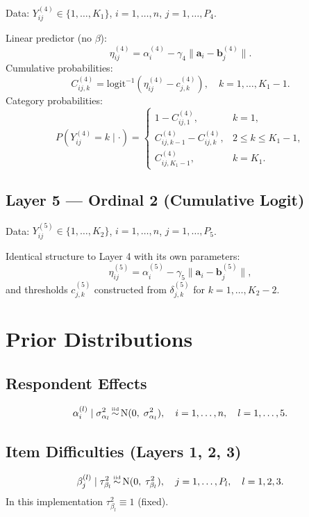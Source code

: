 \documentclass[A4paper,11pt]{article}
\newcommand{\msim}{\mathop{\rm \sim}}
\newcommand{\iid}{\msim\limits^{\mbox{\tiny iid}}}
\begin{document}
Data: $Y^{(4)}_{ij} \in \{1,\dots,K_1\}$, \; $i=1,\dots,n$, \; $j=1,\dots,P_4$.

Linear predictor (no $\beta$):
\[
  \eta^{(4)}_{ij} = \alpha^{(4)}_i - \gamma_4 \|\bm{a}_i - \bm{b}^{(4)}_j\|.
\]
Cumulative probabilities:
\[
  C^{(4)}_{ij,k} = \mathrm{logit}^{-1}\!\left(\eta^{(4)}_{ij} - c^{(4)}_{j,k}\right), \quad k=1,\dots,K_1-1.
\]
Category probabilities:
\[
  P\!\left(Y^{(4)}_{ij} = k \mid \cdot\right) =
  \begin{cases}
    1 - C^{(4)}_{ij,1}, & k = 1, \\
    C^{(4)}_{ij,k-1} - C^{(4)}_{ij,k}, & 2 \le k \le K_1-1, \\
    C^{(4)}_{ij,K_1-1}, & k = K_1.
  \end{cases}
\]

\subsection{Layer 5 --- Ordinal 2 (Cumulative Logit)}

Data: $Y^{(5)}_{ij} \in \{1,\dots,K_2\}$, \; $i=1,\dots,n$, \; $j=1,\dots,P_5$.

Identical structure to Layer 4 with its own parameters:
\[
  \eta^{(5)}_{ij} = \alpha^{(5)}_i - \gamma_5 \|\bm{a}_i - \bm{b}^{(5)}_j\|,
\]
and thresholds $c^{(5)}_{j,k}$ constructed from $\delta^{(5)}_{j,k}$ for $k=1,\dots,K_2-2$.

\section{Prior Distributions}

\subsection{Respondent Effects}

\[
  \alpha^{(l)}_i \mid \sigma^2_{\alpha_l} \iid \mathrm{N}(0,\; \sigma^2_{\alpha_l}), \quad i=1,\dots,n, \quad l=1,\dots,5.
\]

\subsection{Item Difficulties (Layers 1, 2, 3)}

\[
  \beta^{(l)}_j \mid \tau^2_{\beta_l} \iid \mathrm{N}(0,\; \tau^2_{\beta_l}), \quad j=1,\dots,P_l, \quad l=1,2,3.
\]
In this implementation $\tau^2_{\beta_l} \equiv 1$ (fixed).
\end{document}
